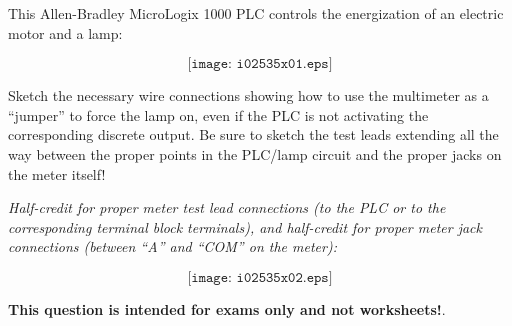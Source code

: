 

This Allen-Bradley MicroLogix 1000 PLC controls the energization of an electric motor and a lamp:

$$\texttt{[image: i02535x01.eps]}$$

Sketch the necessary wire connections showing how to use the multimeter as a ``jumper'' to force the lamp on, even if the PLC is not activating the corresponding discrete output.  Be sure to sketch the test leads extending all the way between the proper points in the PLC/lamp circuit and the proper jacks on the meter itself!







{\it Half-credit for proper meter test lead connections (to the PLC or to the corresponding terminal block terminals), and half-credit for proper meter jack connections (between ``A'' and ``COM'' on the meter):}

$$\texttt{[image: i02535x02.eps]}$$







{\bf This question is intended for exams only and not worksheets!}.



